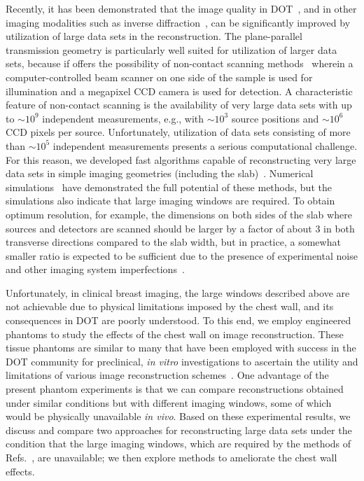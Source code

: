  Recently, it has been demonstrated that the image quality in DOT~\cite{wang_05_1,konecky_08_1,bonfert-taylor_12_1}, and in other imaging modalities such as inverse diffraction~\cite{chaillat_12_1}, can be significantly improved by utilization of large data sets in the reconstruction. The plane-parallel transmission geometry is particularly well suited for utilization of larger data sets, because if offers the possibility of non-contact scanning methods~\cite{schulz_03_1,ripoll_03_2,ripoll_04_1,turner_05_1,wang_05_1} wherein a computer-controlled beam scanner on one side of the sample is used for illumination and a megapixel CCD camera is used for detection.  A characteristic feature of non-contact scanning is the availability of very large data sets with up to $\sim 10^9$ independent measurements, e.g., with $\sim 10^3$ source positions and $\sim 10^6$ CCD pixels per source. Unfortunately, utilization of data sets consisting of more than $\sim 10^5$ independent measurements presents a serious computational challenge. For this reason, we developed fast algorithms capable of reconstructing very large data sets in simple imaging geometries (including the slab)~\cite{markel_01_3,markel_02_2,markel_03_1,markel_03_2,markel_04_4}. Numerical simulations~\cite{markel_02_2} have demonstrated the full potential of these methods, but the simulations also indicate that large imaging windows are required. To obtain optimum resolution, for example, the dimensions on both sides of the slab where sources and detectors are scanned should be larger by a factor of about $3$ in both transverse directions compared to the slab width, but in practice, a somewhat smaller ratio is expected to be sufficient due to the presence of experimental
noise and other imaging system imperfections~\cite{wang_05_1,konecky_08_1}.

Unfortunately, in clinical breast imaging, the large windows described above are not achievable due to physical limitations imposed by the chest wall, and its consequences in DOT are poorly understood. To this end, we employ engineered phantoms to study the effects of the chest wall on image reconstruction.
These tissue phantoms are similar to many that have been employed with success in the DOT community for preclinical, {\em in vitro} investigations to ascertain the utility and limitations of various image reconstruction schemes~\cite{Pogue2006,Cerussi2012,culver_03_1}. One advantage of the present phantom experiments is that we can compare reconstructions obtained under similar conditions but with different imaging windows, some of which would be physically unavailable {\em in vivo}. Based on these experimental results, we discuss and compare two approaches for reconstructing large data sets under the condition that the large imaging windows, which are required by the methods of Refs.~\cite{markel_01_3,markel_02_2,markel_03_1,markel_03_2,markel_04_4}, are unavailable; we then explore methods to ameliorate the chest wall effects.

